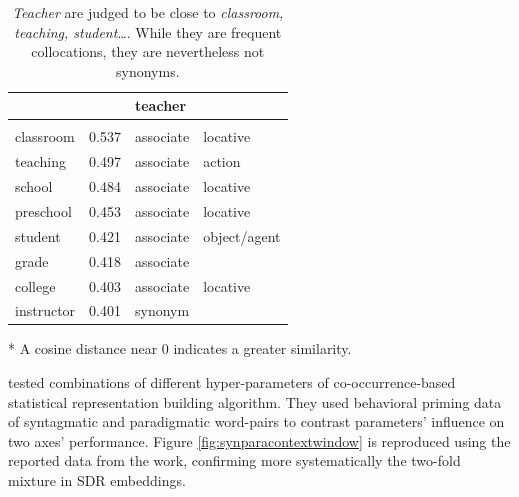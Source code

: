 \begin{table}
    \centering
    \begin{ThreePartTable}  
    \begin{tabularx}{\textwidth}{*{4}{L}}
     & teacher & \\
    \toprule
     &  &  &  \\
  \toprule
classroom & 0.537 & associate & locative \\
teaching & 0.497 & associate & action \\
school & 0.484& associate & locative \\
preschool & 0.453 & associate & locative \\
student & 0.421& associate & object/agent\\
grade & 0.418 & associate & \\
college & 0.403 & associate & locative \\
instructor & 0.401 & synonym & \\

    \bottomrule
    \end{tabularx}
    \begin{tablenotes}
        \footnotesize
        \item[*] A cosine distance near 0 indicates a greater similarity.
    \end{tablenotes}  
    \end{ThreePartTable}
    \caption[Example of Syntagmatic and Paradigmatic Mixture in Statistical Semantic Models]{\emph{Teacher} are judged to be close to \emph{classroom, teaching, student}\dots. While they are frequent collocations, they are nevertheless not synonyms. \label{tab:gloveneighbours}}
\end{table}

\textcite{lapesaContrastingSyntagmaticParadigmatic2014} tested combinations of different hyper-parameters of co-occurrence-based statistical representation building algorithm. They used behavioral priming data of syntagmatic and paradigmatic word-pairs to contrast parameters' influence on two axes' performance. Figure \ref{fig:synparacontextwindow} is reproduced using the reported data from the work, confirming more systematically the two-fold mixture in SDR embeddings.

